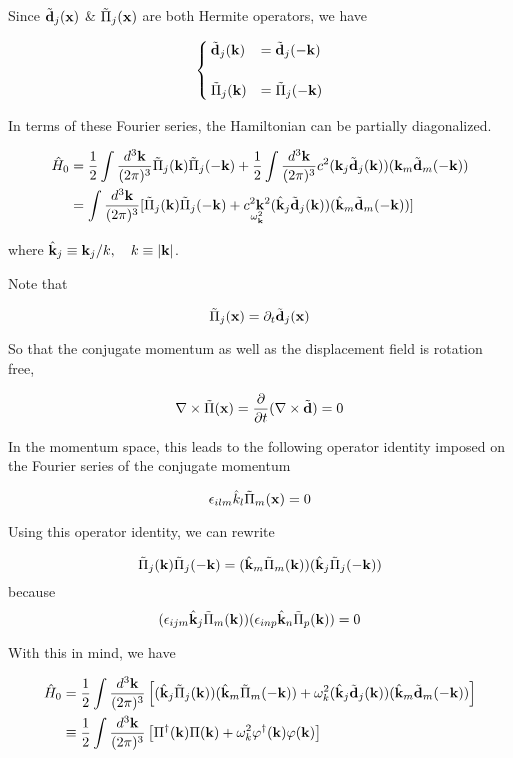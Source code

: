 
Since $\tilde{\bf d}_j({\bf x})$ \& $\tilde{\Pi}_j({\bf x})$ are both Hermite operators, we have

\[\begin{cases}
\tilde{\bf d}_j({\bf k}) &= \tilde{\bf d}_j({-\bf k})\\
\ & \\
\tilde{\Pi}_j({\bf k}) &= \tilde{\Pi}_j(-\bf k)
\end{cases}\]

In terms of these Fourier series, the Hamiltonian can be partially diagonalized. 

\[\begin{split}
\hat{H}_0 &= \frac{1}{2}\int\frac{d^3{\bf k}}{(2\pi)^3}\tilde{\Pi}_j({\bf k})\tilde{\Pi}_j({-\bf k}) + \frac{1}{2}\int\frac{d^3{\bf k}}{(2\pi)^3} c^2({\bf k}_j\tilde{\bf d}_j({\bf k}))({\bf k}_m\tilde{\bf d}_m(-{\bf k}))\\
&=\int\frac{d^3{\bf k}}{(2\pi)^3}[\tilde{\Pi}_j({\bf k})\tilde{\Pi}_j({-\bf k})+\underset{\omega_{\bf k}^2}{c^2{\bf k}^2}(\hat{\bf k}_j\tilde{\bf d}_j({\bf k}))(\hat{\bf k}_m\tilde{\bf d}_m(-{\bf k}))]
\end{split}\]

where $\hat{\bf k}_j \equiv {\bf k}_j/k,\quad k\equiv|\bf k|$. 

Note that

\[\tilde{\Pi}_j({\bf x}) = \partial_t\tilde{\bf d}_j(\bf x) \]

So that the conjugate momentum as well as the displacement field is rotation free, 

\[\nabla\times\tilde{\Pi}({\bf x}) = \frac{\partial}{\partial t}(\nabla\times\tilde{\bf d}) = 0 \]

In the momentum space, this leads to the following operator identity imposed on the Fourier series of the conjugate momentum

\[\epsilon_{ilm}\hat{k}_l\tilde{\Pi}_m({\bf x}) = 0 \]

Using this operator identity, we can rewrite

\[\tilde{\Pi}_j({\bf k})\tilde{\Pi}_j({\bf -k}) = (\hat{\bf k}_m\tilde{\Pi}_m({\bf k})) (\hat{\bf k}_j\tilde{\Pi}_j({\bf -k})) \]
because
\[(\epsilon_{ijm}\hat{\bf k}_j\tilde{\Pi}_m({\bf k}))(\epsilon_{inp}\hat{\bf k}_n\tilde{\Pi}_p({\bf k})) = 0 \]

With this in mind, we have

\[\begin{split}
\hat{H}_0 &=\frac{1}{2}\int\frac{d^3{\bf k}}{(2\pi)^3}\left[(\hat{\bf k}_j\tilde{\Pi}_j({\bf k})) (\hat{\bf k}_m\tilde{\Pi}_m({\bf -k})) + \omega_k^2 (\hat{\bf k}_j\tilde{\bf d}_j({\bf k}))(\hat{\bf k}_m\tilde{\bf d}_m(-{\bf k}))\right]\\
&\equiv \frac{1}{2}\int\frac{d^3{\bf k}}{(2\pi)^3}\left[\Pi^\dagger({\bf k})\Pi({\bf k}) + \omega_k^2\varphi^\dagger({\bf k})\varphi({\bf k})\right]
\end{split}\]

